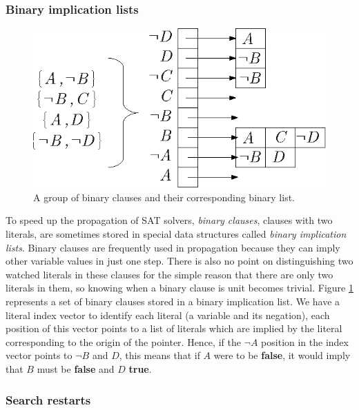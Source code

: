 \documentclass[12pt]{diicc}
\begin{document}
\subsubsection{Binary implication lists}

\begin{figure}[h!]
	\centering
		\includegraphics[scale=1]{binary_lists}
	\caption{A group of binary clauses and their corresponding binary list.}
	\label{fig:binary list}
\end{figure}

To speed up the propagation of SAT solvers, \textit{binary clauses}, clauses with two literals, are sometimes stored in special data structures called \textit{binary implication lists}. Binary clauses are frequently used in propagation because they can imply other variable values in just one step. There is also no point on distinguishing two watched literals in these clauses for the simple reason that there are only two literals in them, so knowing when a binary clause is unit becomes trivial. Figure \ref{fig:binary list} represents a set of binary clauses stored in a binary implication list. We have a literal index vector to identify each literal (a variable and its negation), each position of this vector points to a list of literals which are implied by the literal corresponding to the origin of the pointer. Hence, if the $\neg A$ position in the index vector points to $\neg B$ and $D$, this means that if $A$ were to be \textbf{false}, it would imply that $B$ must be \textbf{false} and $D$ \textbf{true}.

\subsubsection{Search restarts}
\end{document}
